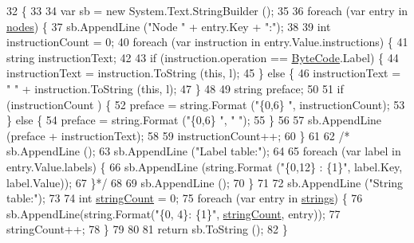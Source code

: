 \begin{DoxyCode}
32                                           \{
33 
34             var sb = \textcolor{keyword}{new} System.Text.StringBuilder ();
35 
36             \textcolor{keywordflow}{foreach} (var entry \textcolor{keywordflow}{in} \hyperlink{a00067_a3f4928a577c88263ad016be259b175c4}{nodes}) \{
37                 sb.AppendLine (\textcolor{stringliteral}{"Node "} + entry.Key + \textcolor{stringliteral}{":"});
38 
39                 \textcolor{keywordtype}{int} instructionCount = 0;
40                 \textcolor{keywordflow}{foreach} (var instruction \textcolor{keywordflow}{in} entry.Value.instructions) \{
41                     \textcolor{keywordtype}{string} instructionText;
42 
43                     \textcolor{keywordflow}{if} (instruction.operation == \hyperlink{a00026_ad5dfb6ee68ca7469623ad3e459f98894}{ByteCode}.Label) \{
44                         instructionText = instruction.ToString (\textcolor{keyword}{this}, l);
45                     \} \textcolor{keywordflow}{else} \{
46                         instructionText = \textcolor{stringliteral}{"    "} + instruction.ToString (\textcolor{keyword}{this}, l);
47                     \}
48 
49                     \textcolor{keywordtype}{string} preface;
50 
51                     \textcolor{keywordflow}{if} (instructionCount %
      ) \{
52                         preface = string.Format (\textcolor{stringliteral}{"\{0,6\}   "}, instructionCount);
53                     \} \textcolor{keywordflow}{else} \{
54                         preface = string.Format (\textcolor{stringliteral}{"\{0,6\}   "}, \textcolor{stringliteral}{" "});
55                     \}
56 
57                     sb.AppendLine (preface + instructionText);
58 
59                     instructionCount++;
60                 \}
61 
62                 \textcolor{comment}{/* sb.AppendLine ();}
63 \textcolor{comment}{                sb.AppendLine ("Label table:");}
64 \textcolor{comment}{}
65 \textcolor{comment}{                foreach (var label in entry.Value.labels) \{}
66 \textcolor{comment}{                    sb.AppendLine (string.Format ("\{0,12\} : \{1\}", label.Key, label.Value));}
67 \textcolor{comment}{                \}*/}
68 
69                 sb.AppendLine ();
70             \}
71 
72             sb.AppendLine (\textcolor{stringliteral}{"String table:"});
73 
74             \textcolor{keywordtype}{int} \hyperlink{a00067_a8ef1d10094ef00311aade6715ba78ec7}{stringCount} = 0;
75             \textcolor{keywordflow}{foreach} (var entry \textcolor{keywordflow}{in} \hyperlink{a00067_a91518fda7e41bf573f66c6946dd3b4cb}{strings}) \{
76                 sb.AppendLine(string.Format(\textcolor{stringliteral}{"\{0, 4\}: \{1\}"}, \hyperlink{a00067_a8ef1d10094ef00311aade6715ba78ec7}{stringCount}, entry));
77                 stringCount++;
78             \}
79 
80 
81             \textcolor{keywordflow}{return} sb.ToString ();
82         \}
\end{DoxyCode}
